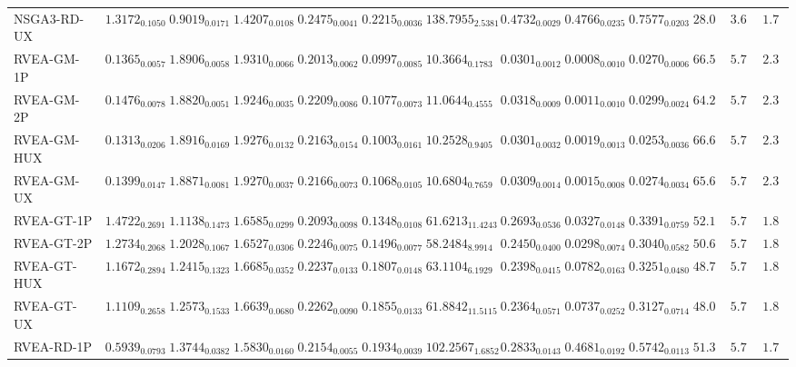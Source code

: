 \documentclass[11pt,a4paper]{article}
\begin{document}
\begin{table}[H]
{\begin{tabular}{lcccccccccccc}
NSGA3-RD-UX & $1.3172_{0.1050}$ & $0.9019_{0.0171}$ & $\mathbf{1.4207}_{0.0108}$ & $0.2475_{0.0041}$ & $0.2215_{0.0036}$ & $138.7955_{2.5381}$ & $0.4732_{0.0029}$ & $0.4766_{0.0235}$ & $0.7577_{0.0203}$ & $28.00$ & $3.67$ & $\mathbf{1.78}$ \\
RVEA-GM-1P & $0.1365_{0.0057}$ & $1.8906_{0.0058}$ & $1.9310_{0.0066}$ & $0.2013_{0.0062}$ & $0.0997_{0.0085}$ & $10.3664_{0.1783}$ & $0.0301_{0.0012}$ & $0.0008_{0.0010}$ & $\mathbf{0.0270}_{0.0006}$ & $66.56$ & $5.78$ & $2.33$ \\
RVEA-GM-2P & $0.1476_{0.0078}$ & $1.8820_{0.0051}$ & $1.9246_{0.0035}$ & $0.2209_{0.0086}$ & $0.1077_{0.0073}$ & $11.0644_{0.4555}$ & $0.0318_{0.0009}$ & $0.0011_{0.0010}$ & $\mathbf{0.0299}_{0.0024}$ & $64.22$ & $5.78$ & $2.33$ \\
RVEA-GM-HUX & $0.1313_{0.0206}$ & $1.8916_{0.0169}$ & $1.9276_{0.0132}$ & $0.2163_{0.0154}$ & $0.1003_{0.0161}$ & $10.2528_{0.9405}$ & $0.0301_{0.0032}$ & $0.0019_{0.0013}$ & $\mathbf{0.0253}_{0.0036}$ & $66.67$ & $5.78$ & $2.33$ \\
RVEA-GM-UX & $0.1399_{0.0147}$ & $1.8871_{0.0081}$ & $1.9270_{0.0037}$ & $0.2166_{0.0073}$ & $0.1068_{0.0105}$ & $10.6804_{0.7659}$ & $0.0309_{0.0014}$ & $0.0015_{0.0008}$ & $\mathbf{0.0274}_{0.0034}$ & $65.67$ & $5.78$ & $2.33$ \\
RVEA-GT-1P & $1.4722_{0.2691}$ & $1.1138_{0.1473}$ & $1.6585_{0.0299}$ & $0.2093_{0.0098}$ & $0.1348_{0.0108}$ & $61.6213_{11.4243}$ & $0.2693_{0.0536}$ & $0.0327_{0.0148}$ & $0.3391_{0.0759}$ & $52.11$ & $5.78$ & $1.89$ \\
RVEA-GT-2P & $1.2734_{0.2068}$ & $1.2028_{0.1067}$ & $1.6527_{0.0306}$ & $0.2246_{0.0075}$ & $0.1496_{0.0077}$ & $58.2484_{8.9914}$ & $0.2450_{0.0400}$ & $0.0298_{0.0074}$ & $0.3040_{0.0582}$ & $50.67$ & $5.78$ & $1.89$ \\
RVEA-GT-HUX & $1.1672_{0.2894}$ & $1.2415_{0.1323}$ & $1.6685_{0.0352}$ & $0.2237_{0.0133}$ & $0.1807_{0.0148}$ & $63.1104_{6.1929}$ & $0.2398_{0.0415}$ & $0.0782_{0.0163}$ & $0.3251_{0.0480}$ & $48.78$ & $5.78$ & $1.89$ \\
RVEA-GT-UX & $1.1109_{0.2658}$ & $1.2573_{0.1533}$ & $1.6639_{0.0680}$ & $0.2262_{0.0090}$ & $0.1855_{0.0133}$ & $61.8842_{11.5115}$ & $0.2364_{0.0571}$ & $0.0737_{0.0252}$ & $0.3127_{0.0714}$ & $48.00$ & $5.78$ & $1.89$ \\
RVEA-RD-1P & $0.5939_{0.0793}$ & $1.3744_{0.0382}$ & $1.5830_{0.0160}$ & $0.2154_{0.0055}$ & $0.1934_{0.0039}$ & $102.2567_{1.6852}$ & $0.2833_{0.0143}$ & $0.4681_{0.0192}$ & $0.5742_{0.0113}$ & $51.33$ & $5.78$ & $\mathbf{1.78}$ \\

\end{tabular}}
\end{table}
\end{document}

